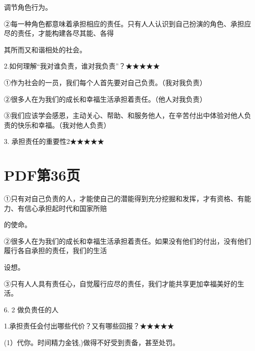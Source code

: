 \documentclass[lang=cn,11pt]{elegantbook}
\newcommand{\daofasym}[1]{{\daofasymbolfont #1}}
\newcommand{\daofasym}[1]{#1}
\begin{document}
调节角色行为。\par

\daofasym{②}每一种角色都意味着承担相应的责任。只有人人认识到自己扮演的角色、承担应尽的责任，才能构建各尽其能、各得\par

其所而又和谐相处的社会。\par

2.如何理解“我对谁负责，谁对我负责”？\daofasym{★}\daofasym{★}\daofasym{★}\daofasym{★}\daofasym{★}\par

\daofasym{①}作为社会的一员，我们每个人首先要对自己负责。（我对我负责）\par

\daofasym{②}很多人在为我们的成长和幸福生活承担着责任。（他人对我负责）\par

\daofasym{③}我们应该学会感恩，主动关心、帮助、和服务他人，在辛苦付出中体验对他人负责的快乐和幸福。（我对他人负责）\par

3. 承担责任的重要性2\daofasym{★}\daofasym{★}\daofasym{★}\daofasym{★}\daofasym{★}\par


\section*{PDF第36页}

\daofasym{①}只有对自己负责的人，才能使自己的潜能得到充分挖掘和发挥，才有资格、有能力、有信心承担起时代和国家所赔\par

的使命。\par

\daofasym{②}很多人在为我们的成长和幸福生活承担着责任。如果没有他们的付出，没有他们履行各自承担的责任，我们的生活\par

设想。\par

\daofasym{③}只有人人具有责任心，自觉履行应尽的责任，我们才能共享更加幸福美好的生活。\par

6. 2 做负贵任的人\par

1.承担责任会付出哪些代价？又有哪些回报？\daofasym{★}\daofasym{★}\daofasym{★}\daofasym{★}\daofasym{★}\par

(1）代你。时间精力金钱,)做得不好受到责备，甚至处罚。\par
\end{document}
